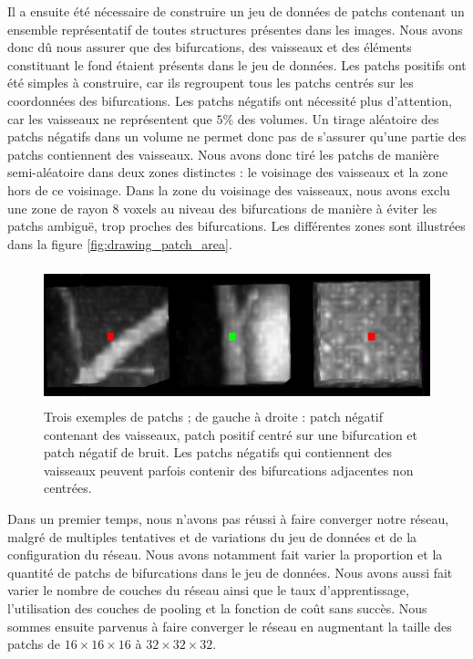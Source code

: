 Il a ensuite été nécessaire de construire un jeu de données de patchs contenant un ensemble représentatif de toutes structures présentes dans les images. Nous avons donc dû nous assurer que des bifurcations, des vaisseaux et des éléments constituant le fond étaient présents dans le jeu de données.
Les patchs positifs ont été simples à construire, car ils regroupent tous les patchs centrés sur les coordonnées des bifurcations. Les patchs négatifs ont nécessité plus d'attention, car les vaisseaux ne représentent que $5\percent{}$ des volumes. Un tirage aléatoire des patchs négatifs dans un volume ne permet donc pas de s'assurer qu'une partie des patchs contiennent des vaisseaux. Nous avons donc tiré les patchs de manière semi-aléatoire dans deux zones distinctes : le voisinage des vaisseaux et la zone hors de ce voisinage. Dans la zone du voisinage des vaisseaux, nous avons exclu une zone de rayon $8$ voxels au niveau des bifurcations de manière à éviter les patchs ambiguë, trop proches des bifurcations. Les différentes zones sont illustrées dans la figure \ref{fig:drawing_patch_area}.
\begin{figure}[!ht]
    \centering
    \includegraphics[height=4cm]{Images/exp_patchs_exemple.png}
    \caption{Trois exemples de patchs ; de gauche à droite : patch négatif contenant des vaisseaux, patch positif centré sur une bifurcation et patch négatif de bruit. Les patchs négatifs qui contiennent des vaisseaux peuvent parfois contenir des bifurcations adjacentes non centrées.}
    \label{fig:exp_patchs}
\end{figure}

Dans un premier temps, nous n'avons pas réussi à faire converger notre réseau, malgré de multiples tentatives et de variations du jeu de données et de la configuration du réseau. Nous avons notamment fait varier la proportion et la quantité de patchs de bifurcations dans le jeu de données. Nous avons aussi fait varier le nombre de couches du réseau ainsi que le taux d'apprentissage, l'utilisation des couches de pooling et la fonction de coût sans succès. Nous sommes ensuite parvenus à faire converger le réseau en augmentant la taille des patchs de  $16 \times 16 \times 16$ à $32 \times 32 \times 32$.

